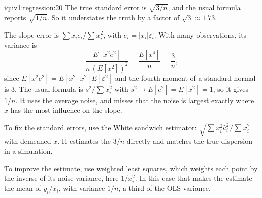 \begin{solution}{iq:iv1:regression:20}
The true standard error is $\sqrt{3/n}$, and the usual formula reports $\sqrt{1/n}$. So it understates the truth by a factor of $\sqrt3 \approx 1.73$.

The slope error is $\sum x_i e_i / \sum x_i^2$, with $e_i = |x_i|\varepsilon_i$. With many observations, its variance is
\[
\frac{E[x^2 e^2]}{n\,(E[x^2])^2} = \frac{E[x^4]}{n} = \frac{3}{n} ,
\]
since $E[x^2 e^2] = E[x^2 \cdot x^2]E[\varepsilon^2]$ and the fourth moment of a standard normal is 3. The usual formula is $s^2/\sum x_i^2$ with $s^2 \to E[e^2] = E[x^2] = 1$, so it gives $1/n$. It uses the average noise, and misses that the noise is largest exactly where $x$ has the most influence on the slope.

To fix the standard errors, use the White sandwich estimator: $\sqrt{\sum x_i^2 \hat e_i^2}/\sum x_i^2$ with demeaned $x$. It estimates the $3/n$ directly and matches the true dispersion in a simulation.

To improve the estimate, use weighted least squares, which weights each point by the inverse of its noise variance, here $1/x_i^2$. In this case that makes the estimate the mean of $y_i/x_i$, with variance $1/n$, a third of the OLS variance.

\end{solution}

